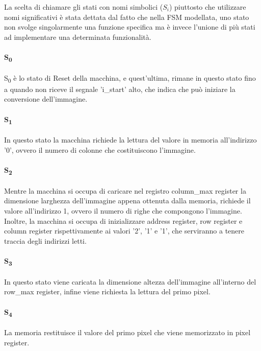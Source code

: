 La scelta di chiamare gli stati con nomi simbolici ($S_i$) piuttosto che utilizzare nomi significativi è stata dettata dal fatto che nella FSM modellata, uno stato non svolge singolarmente una funzione specifica ma è invece l'unione di più stati ad implementare una determinata funzionalità.

\paragraph{S\textsubscript{0}}
S\textsubscript{0} è lo stato di Reset della macchina, e quest'ultima, rimane in questo stato fino a quando non riceve il segnale 'i\_start' alto, che indica che può iniziare la conversione dell'immagine.
\paragraph{S\textsubscript{1}}
In questo stato la macchina richiede la lettura del valore in memoria all'indirizzo '0', ovvero il numero di colonne che costituiscono l'immagine.
\paragraph{S\textsubscript{2}}
Mentre la macchina si occupa di caricare nel registro column\_max register la dimensione larghezza dell'immagine appena ottenuta dalla memoria, richiede il valore all'indirizzo 1, ovvero il numero di righe che compongono l'immagine. Inoltre, la macchina si occupa di inizializzare address register, row register e column register rispettivamente ai valori '2', '1' e '1', che serviranno a tenere traccia degli indirizzi letti.
\paragraph{S\textsubscript{3}}
In questo stato viene caricata la dimensione altezza dell'immagine all'interno del row\_max register, infine viene richiesta la lettura del primo pixel.
\paragraph{S\textsubscript{4}}
La memoria restituisce il valore del primo pixel che viene memorizzato in pixel register.
